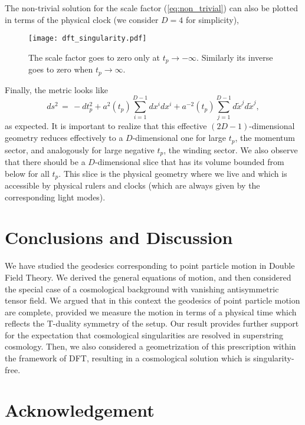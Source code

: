\documentclass[prd, aps, superscriptaddress, preprintnumbers, twocolumn, floatfix, nofootinbib]{revtex4}
\begin{document}
The non-trivial solution for the scale factor (\ref{eq:non_trivial}) can also be plotted in terms of the physical clock (we consider $D=4$ for simplicity),
\begin{figure}[H]
    \centering
    \texttt{[image: dft\_singularity.pdf]}
    \caption{The scale factor goes to zero only at $t_p \rightarrow -\infty$. Similarly its inverse goes to zero when $t_p \rightarrow \infty$.}
    \label{fig2}
\end{figure}

Finally, the metric looks like
\begin{equation}
ds^{2} \, = \, -dt_{p}^{2}+a^{2}\left(t_{p}\right)\sum_{i=1}^{D-1}dx^i dx^i+a^{-2}\left(t_{p}\right)\sum_{j=1}^{D-1}d\tilde{x}^j d\tilde{x}^j,
\end{equation}
as expected. It is important to realize that this effective $(2D-1)$-dimensional geometry reduces
effectively to a $D$-dimensional one for large $t_p$, the momentum sector, and analogously
for large negative $t_p$, the winding sector. We also observe that there should be a $D$-dimensional
slice that has its volume bounded from below for all $t_p$. This slice is the physical
geometry where we live and which is accessible by physical rulers and clocks (which are always
given by the corresponding light modes).


\section{Conclusions and Discussion}

We have studied the geodesics corresponding to point particle motion
in Double Field Theory. We derived the general equations of motion,
and then considered the special case of a cosmological background
with vanishing antisymmetric tensor field. We
argued that in this context the geodesics of point particle motion are
complete, provided we measure the motion in terms of a physical time
which reflects the T-duality symmetry of the setup. Our result provides
further support for the expectation that cosmological singularities are
resolved in superstring cosmology. Then, we also considered a geometrization of
this prescription within the framework of DFT, resulting in a cosmological solution which
is singularity-free.

\section*{Acknowledgement}
\noindent
\end{document}
